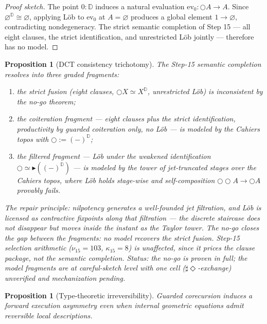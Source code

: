 \documentclass[11pt]{article}
\theoremstyle{plain}
\newtheorem{proposition}[theorem]{Proposition}
\theoremstyle{definition}
\theoremstyle{remark}
\newenvironment{proofsketch}{\begin{proof}[Proof sketch]}{\end{proof}}
\newcommand{\Sharp}{\sharp}
\newcommand{\Next}{\bigcirc}
\newcommand{\Eventually}{\Diamond}
\newcommand{\D}{\mathbb{D}}
\begin{document}
\begin{proofsketch}
The point \(0:\D\) induces a natural evaluation \(\mathrm{ev}_0:\Next A\to A\). Since \(\varnothing^{\D}\cong\varnothing\), applying L\"ob to \(\mathrm{ev}_0\) at \(A=\varnothing\) produces a global element \(1\to\varnothing\), contradicting nondegeneracy. The strict semantic completion of Step 15 --- all eight clauses, the strict identification, and unrestricted L\"ob jointly --- therefore has no model.
\end{proofsketch}

\begin{proposition}[DCT consistency trichotomy]
The Step-15 semantic completion resolves into three graded fragments:
\begin{enumerate}[leftmargin=*]
\item the strict fusion (eight clauses, \(\Next X\simeq X^{\D}\), unrestricted L\"ob) is inconsistent by the no-go theorem;
\item the coiteration fragment --- eight clauses plus the strict identification, productivity by guarded coiteration only, no L\"ob --- is modeled by the Cahiers topos with \(\Next:=(-)^{\D}\);
\item the filtered fragment --- L\"ob under the weakened identification \(\Next\simeq\blacktriangleright((-)^{\D})\) --- is modeled by the tower of jet-truncated stages over the Cahiers topos, where L\"ob holds stage-wise and self-composition \(\Next\Next A\to\Next A\) provably fails.
\end{enumerate}
The repair principle: nilpotency generates a well-founded jet filtration, and L\"ob is licensed as contractive fixpoints along that filtration --- the discrete staircase does not disappear but moves inside the instant as the Taylor tower. The no-go closes the gap between the fragments: no model recovers the strict fusion. Step-15 selection arithmetic (\(\nu_{15}=103\), \(\kappa_{15}=8\)) is unaffected, since it prices the clause package, not the semantic completion. Status: the no-go is proven in full; the model fragments are at careful-sketch level with one cell (\(\Sharp\Eventually\)-exchange) unverified and mechanization pending.
\end{proposition}

\begin{proposition}[Type-theoretic irreversibility]
Guarded corecursion induces a forward execution asymmetry even when internal geometric equations admit reversible local descriptions.
\end{proposition}
\end{document}
